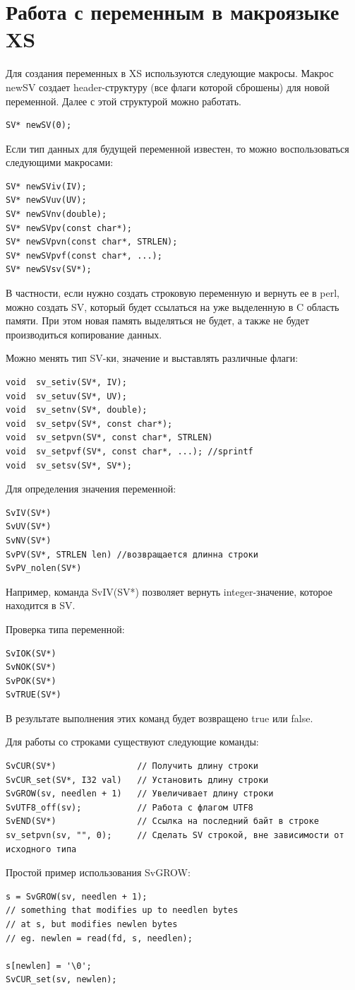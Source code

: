 \section{Работа с переменным в макроязыке XS}
Для создания переменных в XS используются следующие макросы. Макрос newSV создает header-структуру (все флаги которой сброшены) для новой переменной. Далее с этой структурой можно работать.
\begin{verbatim}
SV* newSV(0);
\end{verbatim}
Если тип данных для будущей переменной известен, то можно воспользоваться следующими макросами:
\begin{verbatim}
SV* newSViv(IV);
SV* newSVuv(UV);
SV* newSVnv(double);
SV* newSVpv(const char*);
SV* newSVpvn(const char*, STRLEN);
SV* newSVpvf(const char*, ...);
SV* newSVsv(SV*);
\end{verbatim}
В частности, если нужно создать строковую переменную и вернуть ее в perl, можно создать SV, который будет ссылаться на уже выделенную в C область памяти. При этом новая память выделяться не будет, а также не будет производиться копирование данных.

Можно менять тип SV-ки, значение и выставлять различные флаги:
\begin{verbatim}
void  sv_setiv(SV*, IV);
void  sv_setuv(SV*, UV);
void  sv_setnv(SV*, double);
void  sv_setpv(SV*, const char*);
void  sv_setpvn(SV*, const char*, STRLEN)
void  sv_setpvf(SV*, const char*, ...); //sprintf
void  sv_setsv(SV*, SV*);
\end{verbatim}

Для определения значения переменной:
\begin{verbatim}
SvIV(SV*)
SvUV(SV*)
SvNV(SV*)
SvPV(SV*, STRLEN len) //возвращается длинна строки
SvPV_nolen(SV*)
\end{verbatim}
Например, команда SvIV(SV*) позволяет вернуть integer-значение, которое находится в SV.

Проверка типа переменной:
\begin{verbatim}
SvIOK(SV*)
SvNOK(SV*)
SvPOK(SV*)
SvTRUE(SV*)
\end{verbatim}
В результате выполнения этих команд будет возвращено true или false.

Для работы со строками существуют следующие команды:
\begin{verbatim}
SvCUR(SV*)                // Получить длину строки
SvCUR_set(SV*, I32 val)   // Установить длину строки
SvGROW(sv, needlen + 1)   // Увеличивает длину строки
SvUTF8_off(sv);           // Работа с флагом UTF8
SvEND(SV*)                // Ссылка на последний байт в строке
sv_setpvn(sv, "", 0);     // Сделать SV строкой, вне зависимости от исходного типа
\end{verbatim}
Простой пример использования SvGROW:
\begin{verbatim}
s = SvGROW(sv, needlen + 1);
// something that modifies up to needlen bytes
// at s, but modifies newlen bytes
// eg. newlen = read(fd, s, needlen);

s[newlen] = '\0';
SvCUR_set(sv, newlen);
\end{verbatim}


